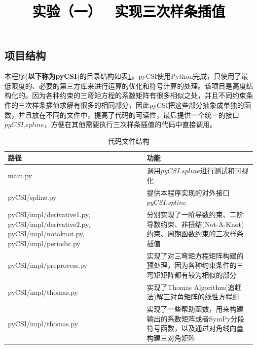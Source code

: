 \documentclass[a4paper,twoside]{article}
\newcommand{\PaperTitle}{实验（一） \ 实现三次样条插值}  %
\begin{document}
\newpage

\title{
	\Large{\textcolor{black}{\PaperTitle}}
}
	
	
\maketitle
	
\tableofcontents
 
\newpage
\begin{spacing}{1.2}

\section{项目结构}
\label{sec:struct}

本程序(\textbf{以下称为pyCSI})的目录结构如表\ref{tbl:codestruct}。pyCSI使用Python完成，只使用了最低限度的、必要的第三方库来进行运算的优化和符号计算的处理。该项目是高度结构化的。因为各种约束的三弯矩方程的系数矩阵有很多相似之处，并且不同约束条件的三次样条插值求解有很多的相同部分，因此pyCSI把这些部分抽象成单独的函数，并且放在不同的文件中，提高了代码的可读性，最后提供一个统一的接口$pyCSI.spline$，方便在其他需要执行三次样条插值的代码中直接调用。

\begin{table}[h]
	\caption{代码文件结构}
	\label{tbl:codestruct}
	\begin{center}
		\begin{tabular}{p{5cm}p{8cm}}
			\toprule
			路径 & 功能 \\
			\midrule
			main.py & 调用$pyCSI.spline$进行测试和可视化 \\
			\hline
			pyCSI/spline.py & 提供本程序实现的对外接口$pyCSI.spline$ \\
			\hline
			pyCSI/impl/derivative1.py, pyCSI/impl/derivative2.py, pyCSI/impl/notaknot.py,  pyCSI/impl/periodic.py & 分别实现了一阶导数约束、二阶导数约束、非扭结(Not-A-Knot)约束、周期函数约束的三次样条插值 \\
			\hline
			pyCSI/impl/preprocess.py & 实现了对三弯矩方程矩阵构建的预处理，因为各种约束条件的三弯矩矩阵都有较为相似的部分 \\
			\hline
			pyCSI/impl/thomas.py & 实现了Thomas Algorithm(追赶法)解三对角矩阵的线性方程组 \\
			\hline
			pyCSI/impl/thomas.py & 实现了一些帮助函数，用来构建输出的系数矩阵或者SymPy分段符号函数，以及通过对角线向量构建三对角矩阵 \\
			\bottomrule
		\end{tabular}
	\end{center}
\end{table}


\end{spacing}
\end{document}
